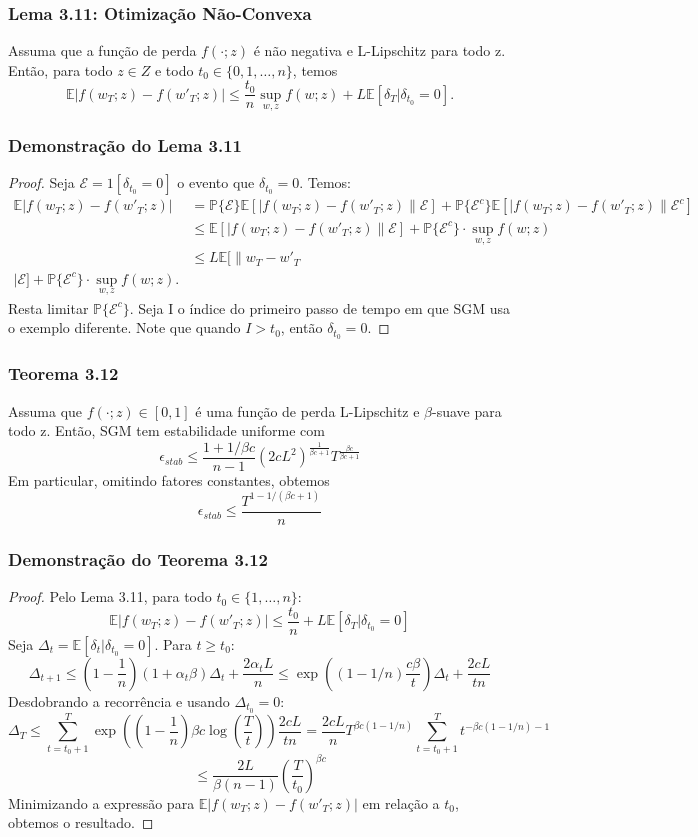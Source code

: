 \documentclass{beamer}
\newcommand{\EE}{\mathbb{E}}
\begin{document}
\begin{frame}
\frametitle{Lema 3.11: Otimização Não-Convexa}
\begin{lemma}
Assuma que a função de perda \(f(\cdot;z)\) é não negativa e L-Lipschitz para todo z.  Então, para todo \(z \in Z\) e todo \(t_0 \in \{0,1,\ldots,n\}\), temos
$$ \EE|f(w_T;z) - f(w'_T;z)| \le \frac{t_0}{n}\sup_{w,z}f(w;z) + L\EE[\delta_T|\delta_{t_0}=0]. $$ 
\end{lemma}
\end{frame}

\begin{frame}
\frametitle{Demonstração do Lema 3.11}
\begin{proof}
Seja \(\mathcal{E} = 1[\delta_{t_0}=0]\) o evento que \(\delta_{t_0}=0\). Temos:
\begin{align*}
\EE|f(w_T;z) - f(w'_T;z)| &= \mathbb{P}\{\mathcal{E}\}\EE[|f(w_T;z) - f(w'_T;z)\|\mathcal{E}] + \mathbb{P}\{\mathcal{E}^c\}\EE[|f(w_T;z) - f(w'_T;z)\|\mathcal{E}^c] \\
&\le \EE[|f(w_T;z) - f(w'_T;z)\|\mathcal{E}] + \mathbb{P}\{\mathcal{E}^c\} \cdot \sup_{w,z}f(w;z) \\
&\le L\EE[\|w_T - w'_T\\|\mathcal{E}] + \mathbb{P}\{\mathcal{E}^c\} \cdot \sup_{w,z}f(w;z).
\end{align*} 
Resta limitar \(\mathbb{P}\{\mathcal{E}^c\}\). Seja I o índice do primeiro passo de tempo em que SGM usa o exemplo diferente. Note que quando \(I > t_0\), então \(\delta_{t_0}=0\). 
\end{proof}
\end{frame}

\begin{frame}
\frametitle{Teorema 3.12}
\begin{theorem}
Assuma que \(f(\cdot;z) \in [0,1]\) é uma função de perda L-Lipschitz e \(\beta\)-suave para todo z.  Então, SGM tem estabilidade uniforme com
$$ \epsilon_{stab} \le \frac{1+1/\beta c}{n-1}(2cL^2)^{\frac{1}{\beta c+1}}T^{\frac{\beta c}{\beta c+1}} $$ 
Em particular, omitindo fatores constantes, obtemos
$$ \epsilon_{stab} \le \frac{T^{1-1/(\beta c+1)}}{n} $$ 
\end{theorem}
\end{frame}

\begin{frame}
\frametitle{Demonstração do Teorema 3.12}
\begin{proof}
Pelo Lema 3.11, para todo \(t_0 \in \{1,\ldots,n\}\):
$$ \EE|f(w_T;z) - f(w'_T;z)| \le \frac{t_0}{n} + L\EE[\delta_T|\delta_{t_0}=0] $$ 
Seja \(\Delta_t = \EE[\delta_t|\delta_{t_0}=0]\). Para \(t \ge t_0\):
$$ \Delta_{t+1} \le (1-\frac{1}{n})(1+\alpha_t\beta)\Delta_t + \frac{2\alpha_t L}{n} \le \exp((1-1/n)\frac{c\beta}{t})\Delta_t + \frac{2cL}{tn} $$ 
Desdobrando a recorrência e usando \(\Delta_{t_0}=0\):
$$ \Delta_T \le \sum_{t=t_0+1}^{T} \exp((1-\frac{1}{n})\beta c \log(\frac{T}{t})) \frac{2cL}{tn} = \frac{2cL}{n} T^{\beta c(1-1/n)} \sum_{t=t_0+1}^{T} t^{-\beta c(1-1/n)-1} $$ 
$$ \le \frac{2L}{\beta(n-1)}(\frac{T}{t_0})^{\beta c} $$ 
Minimizando a expressão para \(\EE|f(w_T;z) - f(w'_T;z)|\) em relação a \(t_0\), obtemos o resultado. 
\end{proof}
\end{frame}
\end{document}
